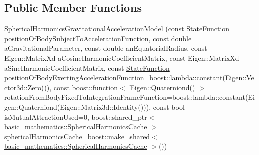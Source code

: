 \subsection*{Public Member Functions}
\begin{DoxyCompactItemize}
\item 
\hyperlink{classtudat_1_1gravitation_1_1SphericalHarmonicsGravitationalAccelerationModel_aa63328c068aae8ae8dcc74a055ce865e}{Spherical\+Harmonics\+Gravitational\+Acceleration\+Model} (const \hyperlink{classtudat_1_1gravitation_1_1SphericalHarmonicsGravitationalAccelerationModelBase_a4ca706c4f941be481fc5f490e49390d8}{State\+Function} position\+Of\+Body\+Subject\+To\+Acceleration\+Function, const double a\+Gravitational\+Parameter, const double an\+Equatorial\+Radius, const Eigen\+::\+Matrix\+Xd a\+Cosine\+Harmonic\+Coefficient\+Matrix, const Eigen\+::\+Matrix\+Xd a\+Sine\+Harmonic\+Coefficient\+Matrix, const \hyperlink{classtudat_1_1gravitation_1_1SphericalHarmonicsGravitationalAccelerationModelBase_a4ca706c4f941be481fc5f490e49390d8}{State\+Function} position\+Of\+Body\+Exerting\+Acceleration\+Function=boost\+::lambda\+::constant(Eigen\+::\+Vector3d\+::\+Zero()), const boost\+::function$<$ Eigen\+::\+Quaterniond() $>$ rotation\+From\+Body\+Fixed\+To\+Integration\+Frame\+Function=boost\+::lambda\+::constant(Eigen\+::\+Quaterniond(Eigen\+::\+Matrix3d\+::\+Identity())), const bool is\+Mutual\+Attraction\+Used=0, boost\+::shared\+\_\+ptr$<$ \hyperlink{classtudat_1_1basic__mathematics_1_1SphericalHarmonicsCache}{basic\+\_\+mathematics\+::\+Spherical\+Harmonics\+Cache} $>$ spherical\+Harmonics\+Cache=boost\+::make\+\_\+shared$<$ \hyperlink{classtudat_1_1basic__mathematics_1_1SphericalHarmonicsCache}{basic\+\_\+mathematics\+::\+Spherical\+Harmonics\+Cache} $>$())
\item 

\end{DoxyCompactItemize}
